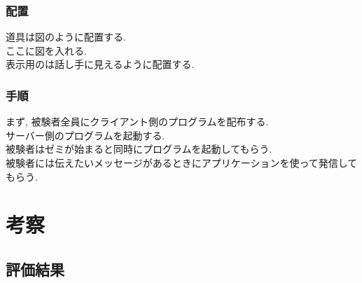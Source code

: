 \documentclass{funthesis}
\begin{document}
\subsection{配置}
道具は図のように配置する. \\

ここに図を入れる.\\

表示用のは話し手に見えるように配置する.

\subsection{手順}
まず, 被験者全員にクライアント側のプログラムを配布する.\\
サーバー側のプログラムを起動する. \\
被験者はゼミが始まると同時にプログラムを起動してもらう. \\
被験者には伝えたいメッセージがあるときにアプリケーションを使って発信してもらう. \\






\chapter{考察}

\section{評価結果}

\end{document}
